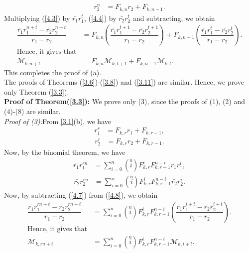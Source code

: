 \begin{align}\label{4.4}
r_2^{n}&=F_{k,n}r_2+F_{k,n-1}.
\end{align}
Multiplying (\ref{4.3}) by $\bar{r_{1}}r_1^t$, (\ref{4.4}) by $\bar{r_{2}}r_2^t$ and subtracting, we obtain \\
\begin{align*}
\dfrac{\bar{r_{1}}r_1^{n+t}-\bar{r_{2}}r_2^{n+t}}{r_1-r_2}&=F_{k,n}(\dfrac{\bar{r_{1}}r_1^{t+1}-\bar{r_{2}}r_2^{t+1}}{r_1-r_2})+F_{k,n-1}(\dfrac{\bar{r_{1}}r_1^{t}-\bar{r_{2}}r_2^{t}}{r_1-r_2}).\\
\text{Hence, it gives that}\\
\mathcal{M}_{k,n+t}&=F_{k,n}\mathcal{M}_{k,t+1}+F_{k,n-1}\mathcal{M}_{k,t}.
\end{align*}
This completes the proof of (a).\\
The proofs of Theorems (\ref{3.6})-(\ref{3.8}) and (\ref{3.11}) are similar. Hence, we prove only Theorem (\ref{3.3}).\\
\textbf{Proof of Theorem(\ref{3.3}):} We prove only (3), since the proofs of (1), (2) and (4)-(8) are similar.\\
\textit{Proof of (3):}From \ref{3.1}(b), we have
\begin{align}
r_1^{r}&=F_{k,r}r_1+F_{k,r-1},
\end{align}
\begin{align}
r_2^{r}&=F_{k,r}r_2+F_{k,r-1}.
\end{align}
Now, by the binomial theorem, we have
\begin{align}\label{4.7}
\bar{r_{1}}r_1^{rn}&=\sum\limits_{i=0}^{n}\left( \stackrel{n}{i}\right)F_{k,r}^iF_{k,r-1}^{n-i}\bar{r_{1}}r_1^i, 
\end{align}
\begin{align}\label{4.8}
\bar{r_{2}}r_2^{rn}&=\sum\limits_{i=0}^{n}\left( \stackrel{n}{i}\right)F_{k,r}^iF_{k,r-1}^{n-i}\bar{r_{2}}r_2^i.
\end{align}
Now, by subtracting (\ref{4.7}) from (\ref{4.8}), we obtain \\
\begin{align*}
\dfrac{\bar{r_{1}}r_1^{rn+t}-\bar{r_{2}}r_2^{rn+t}}{r_1-r_2}&=\sum\limits_{i=0}^{n}\left( \stackrel{n}{i}\right)F_{k,r}^iF_{k,r-1}^{n-i}(\dfrac{\bar{r_{1}}r_1^{i+t}-\bar{r_{2}}r_2^{i+t}}{r_1-r_2}).\\
\text{Hence, it gives that}\\
\mathcal{M}_{k,rn+t}&=\sum\limits_{i=0}^{n}\left( \stackrel{n}{i}\right)F_{k,r}^iF_{k,r-1}^{n-i}\mathcal{M}_{k,i+t}.
\end{align*}
